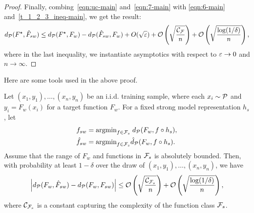 \begin{proof}
Finally, combing~\eqref{eqn:uc-main} and~\eqref{eqn:7-main} with \eqref{eqn:6-main} and~\eqref{t_1_2_3_ineq-main}, we get the result:
\begin{align*}
d_\mathcal{P}(F^\star, \hat{F}_{sw}) \le d_\mathcal{P}(F^\star, F_w) - d_\mathcal{P}(\hat{F}_{sw}, F_w) + O(\sqrt{\varepsilon}) + \mathcal{O}\left(\sqrt{\frac{\mathcal{C}_{\mathcal{F}}}{n}}\right) + \mathcal{O}\left(\sqrt{\frac{\log(1/\delta)}{n}}\right),
\end{align*}
where in the last inequality, we instantiate asymptotics with respect to $\varepsilon \to 0$ and $n \to \infty$.

\end{proof}



Here are some tools used in the above proof.

\begin{lemma}
\label{lem:uniform-convergence}
Let $(x_1,y_1),\dots,(x_n, y_n)$ be an i.i.d. training sample, where each $x_i \sim \mathcal{P}$ and $y_i = F_w(x_i)$ for a target function $F_w$. For a fixed strong model representation $h_s$, let 
\begin{align*}
    & f_{sw} = \text{argmin}_{f \in \mathcal{F}_{s}}\; d_\mathcal{P}(F_w, f \circ h_s),
    \\ & \hat{f}_{sw} = \text{argmin}_{f \in \mathcal{F}_s} \hat{d}_\mathcal{P}(F_w, f \circ h_s).
\end{align*}
Assume that the range of $F_w$ and functions in $\mathcal{F}_s$ is absolutely bounded. Then, with probability at least $1-\delta$ over the draw of $(x_1,y_1),\dots,(x_n, y_n)$, we have
\begin{align*}
    \left|d_{\mathcal{P}}(F_w, \hat{F}_{sw}) - d_{\mathcal{P}}(F_w, F_{sw}) \right| \le \mathcal{O}\left(\sqrt{\frac{\mathcal{C}_{\mathcal{F}_s}}{n}}\right) + \mathcal{O}\left(\sqrt{\frac{\log(1/\delta)}{n}}\right),
\end{align*}
where $\mathcal{C}_{\mathcal{F}_s}$ is a constant capturing the complexity of the function class $\mathcal{F}_s$.
\end{lemma}


